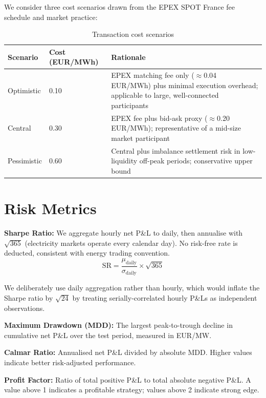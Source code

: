 We consider three cost scenarios drawn from the EPEX SPOT France fee schedule \citep{epex2024} and market practice:

\begin{table}[H]
  \centering
  \caption{Transaction cost scenarios}
  \label{tab:costs}
  \begin{tabular}{llp{8cm}}
    \toprule
    \textbf{Scenario} & \textbf{Cost (EUR/MWh)} & \textbf{Rationale} \\
    \midrule
    Optimistic   & 0.10 & EPEX matching fee only ($\approx$0.04 EUR/MWh) plus minimal execution overhead; applicable to large, well-connected participants \\
    Central      & 0.30 & EPEX fee plus bid-ask proxy ($\approx$0.20 EUR/MWh); representative of a mid-size market participant \\
    Pessimistic  & 0.60 & Central plus imbalance settlement risk in low-liquidity off-peak periods; conservative upper bound \\
    \bottomrule
  \end{tabular}
\end{table}

\section{Risk Metrics}

\textbf{Sharpe Ratio:} We aggregate hourly net P\&L to daily, then annualise with $\sqrt{365}$ (electricity markets operate every calendar day). No risk-free rate is deducted, consistent with energy trading convention.
\begin{equation}
  \text{SR} = \frac{\mu_{\text{daily}}}{\sigma_{\text{daily}}} \times \sqrt{365}
\end{equation}

We deliberately use daily aggregation rather than hourly, which would inflate the Sharpe ratio by $\sqrt{24}$ by treating serially-correlated hourly P\&Ls as independent observations.

\textbf{Maximum Drawdown (MDD):} The largest peak-to-trough decline in cumulative net P\&L over the test period, measured in EUR/MW.

\textbf{Calmar Ratio:} Annualised net P\&L divided by absolute MDD. Higher values indicate better risk-adjusted performance.

\textbf{Profit Factor:} Ratio of total positive P\&L to total absolute negative P\&L. A value above 1 indicates a profitable strategy; values above 2 indicate strong edge.

